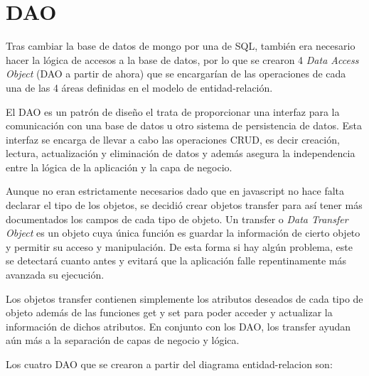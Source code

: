 \documentclass[11pt]{article}
\begin{document}
\section{DAO}

Tras cambiar la base de datos de mongo por una de SQL, también era necesario hacer la lógica de accesos a la base de datos, por lo que se crearon 4 \emph{Data Access Object} (DAO a partir de ahora) que se encargarían de las operaciones de cada una de las 4 áreas definidas en el modelo de entidad-relación.

El DAO es un patrón de diseño el trata de proporcionar una interfaz para la comunicación con una base de datos u otro sistema de persistencia de datos. Esta interfaz se encarga de llevar a cabo las operaciones CRUD, es decir creación, lectura, actualización y eliminación de datos y además asegura la independencia entre la lógica de la aplicación y la capa de negocio.

Aunque no eran estrictamente necesarios dado que en javascript no hace falta declarar el tipo de los objetos, se decidió crear objetos transfer para así tener más documentados los campos de cada tipo de objeto.
Un transfer o \emph{Data Transfer Object} es un objeto cuya única función es guardar la información de cierto objeto y permitir su acceso y manipulación.
De esta forma si hay algún problema, este se detectará cuanto antes y evitará que la aplicación falle repentinamente más avanzada su ejecución.

Los objetos transfer contienen simplemente los atributos deseados de cada tipo de objeto además de las funciones get y set para poder acceder y actualizar la información de dichos atributos.
En conjunto con los DAO, los transfer ayudan aún más a la separación de capas de negocio y lógica.

Los cuatro DAO que se crearon a partir del diagrama entidad-relacion son:
\end{document}
